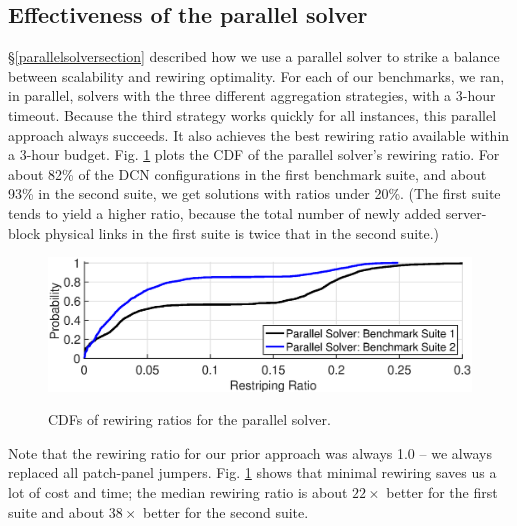 \documentclass[letterpaper,twocolumn,10pt]{article}
\begin{document}

\subsection{Effectiveness of the parallel solver}
\label{ParallelRatioSection}

 \S\ref{parallelsolversection} described how we use a parallel solver to strike a balance between scalability and rewiring optimality.  For each of our benchmarks, we ran, in parallel, solvers with the three different aggregation strategies, with a 3-hour timeout. Because the third strategy works quickly for all instances, this parallel approach always succeeds. It also  achieves the best rewiring ratio available within a 3-hour budget.  Fig. \ref{parallelsolvercdf} plots the CDF of the parallel solver’s rewiring ratio. For about 82\% of the DCN configurations in the first benchmark suite, and about 93\% in the second suite, we get solutions with ratios under 20\%. (The first suite tends to yield a  higher ratio, because the total number of newly added server-block physical links in the first suite is twice that in the second suite.)

\begin{figure}
  \centering
  \includegraphics[scale=0.32]{parallel_rewire_ratio}\\
\vspace{-1ex}
  \caption{CDFs of rewiring ratios for the parallel solver.}\label{parallelsolvercdf}
\end{figure}

Note that the rewiring ratio for our prior approach was always 1.0 -- we always replaced all patch-panel jumpers. Fig. \ref{parallelsolvercdf}  shows that minimal rewiring saves us a lot of cost and time; the median rewiring ratio is about $22\times$ better for the first suite and about $38\times$ better for the second suite.
\end{document}
